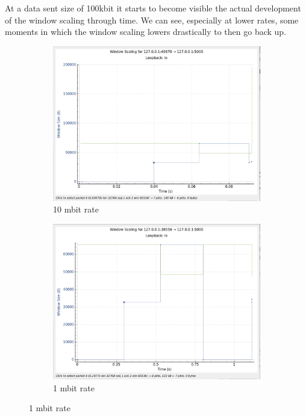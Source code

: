 \documentclass{report}
\begin{document}
At a data sent size of 100kbit it starts to become visible the actual development of the window scaling through time. We can see, especially at lower rates, some moments in which the window scaling lowers drastically to then go back up.

\begin{figure}[H]
    \centering
    \begin{subfigure}[b]{0.45\textwidth}
        \centering
        \includegraphics[width=\textwidth]{Pics/Cubic/r10mbit_s100k_ws}
        \caption{10 mbit rate}
    \end{subfigure}
    \hfill
    \begin{subfigure}[b]{0.45\textwidth}
        \centering
        \includegraphics[width=\textwidth]{Pics/Cubic/r1mbit_s100k_ws}
        \caption{1 mbit rate }
    \end{subfigure}
    \medskip


\end{figure}
\end{document}
